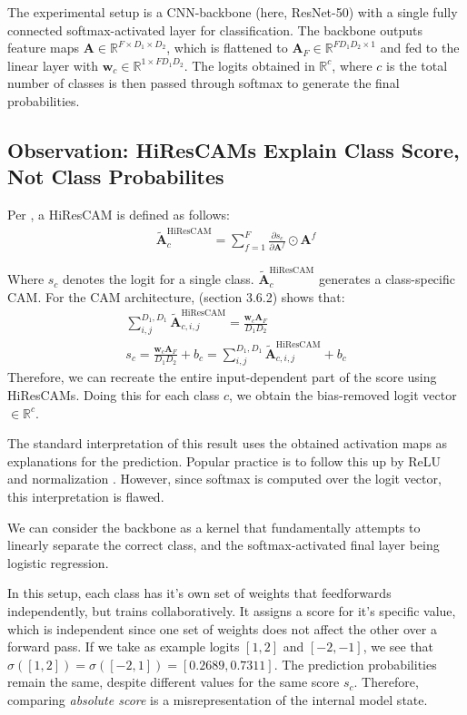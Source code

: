 \documentclass{article}
\begin{document}
The experimental setup is a CNN-backbone (here, ResNet-50) with a single fully connected softmax-activated layer for classification. The backbone outputs feature maps $\bm{A} \in \mathbb{R}^{F \times D_1 \times D_2}$, which is flattened to $\bm{A}_F \in \mathbb{R}^{FD_1D_2 \times 1}$ and fed to the linear layer with $\bm{w}_c \in \mathbb{R}^{1 \times FD_1D_2}$. The logits obtained in $\mathbb{R}^{c}$, where $c$ is the total number of classes is then passed through softmax to generate the final probabilities.

\subsection{Observation: HiResCAMs Explain Class Score, Not Class Probabilites}

Per \cite{draelos2020use}, a HiResCAM is defined as follows:
\begin{gather}
	\tilde{\mathcal{\bm{A}}}_c^{\text{HiResCAM}} = \sum^F_{f=1} \frac{\partial s_c}{\partial \bm{A}^f} \odot \bm{A}^f
\end{gather}

Where $s_c$ denotes the logit for a single class. $\tilde{\mathcal{\bm{A}}}_c^{\text{HiResCAM}}$ generates a class-specific CAM. For the CAM architecture, \cite{draelos2020use} (section 3.6.2) shows that:
\begin{gather}
	\sum^{D_1,D_1}_{i,j} \tilde{\mathcal{\bm{A}}}_{c,i,j}^{\text{HiResCAM}} = \frac{\bm{w}_c \bm{A}_F}{D_1 D_2} \\
	s_c = \frac{\bm{w}_c \bm{A}_F}{D_1 D_2} + b_c = \sum^{D_1,D_1}_{i,j} \tilde{\mathcal{\bm{A}}}_{c,i,j}^{\text{HiResCAM}} + b_c
\end{gather}
Therefore, we can recreate the entire input-dependent part of the score using HiResCAMs. Doing this for each class $c$, we obtain the bias-removed logit vector $\in \mathbb{R}^{c}$.

The standard interpretation of this result uses the obtained activation maps as explanations for the prediction. Popular practice is to follow this up by ReLU and normalization \citep{draelos2020use}. However, since softmax is computed over the logit vector, this interpretation is flawed.

We can consider the backbone as a kernel \citep{jacot2018neural} that fundamentally attempts to linearly separate the correct class, and the softmax-activated final layer being logistic regression.

In this setup, each class has it's own set of weights that feedforwards independently, but trains collaboratively. It assigns a score for it's specific value, which is independent since one set of weights does not affect the other over a forward pass. If we take as example logits $[1,2]$ and $[-2,-1]$, we see that $\sigma([1,2]) = \sigma([-2,1]) = [0.2689, 0.7311]$. The prediction probabilities remain the same, despite different values for the same score $s_c$. Therefore, comparing \textit{absolute score} is a misrepresentation of the internal model state.
\end{document}
